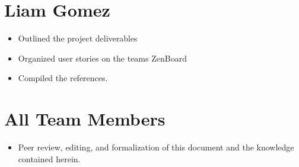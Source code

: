 \documentclass{scrreprt}
\begin{document}
	\section{Liam Gomez}
		\begin{itemize}
			\item Outlined the project deliverables
			\item Organized user stories on the team\textsc{}s ZenBoard
			\item Compiled the references.
		\end{itemize}
	\section{All Team Members}
		\begin{itemize}
			\item Peer review, editing, and formalization of this document and the knowledge contained herein.
		\end{itemize}
\end{document}
